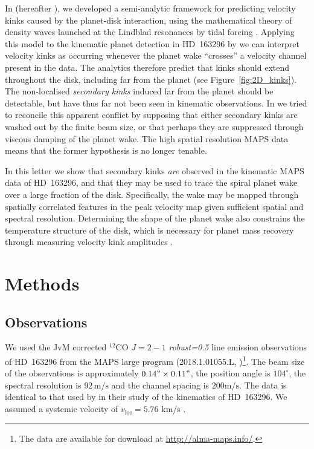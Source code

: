 In \citet{bollati2021} (hereafter ), we developed a semi-analytic framework for predicting velocity kinks caused by the planet-disk interaction, using the mathematical theory of density waves launched at the Lindblad resonances by tidal forcing \citep{goldreich1979,goldreich1980,goodman2001,ogilvie2002,rafikov2002a}.
Applying this model to the kinematic planet detection in HD~163296 by \citet{pinte2018a} we can interpret velocity kinks as occurring whenever the planet wake ``crosses'' a velocity channel present in the data.
The analytics therefore predict that kinks should extend throughout the disk, including far from the planet (see Figure~\ref{fig:2D_kinks}).
The non-localised \textit{secondary kinks} induced far from the planet should be detectable, but have thus far not been seen in kinematic observations.
In  we tried to reconcile this apparent conflict by supposing that either secondary kinks are washed out by the finite beam size, or that perhaps they are suppressed through viscous damping of the planet wake.
The high spatial resolution MAPS data means that the former hypothesis is no longer tenable.

In this letter we show that secondary kinks \textit{are} observed in the kinematic MAPS data of HD~163296, and that they may be used to trace the spiral planet wake over a large fraction of the disk.
Specifically, the wake may be mapped through spatially correlated features in the peak velocity map given sufficient spatial and spectral resolution.
Determining the shape of the planet wake also constrains the temperature structure of the disk, which is necessary for planet mass recovery through measuring velocity kink amplitudes .

\section{Methods}

\subsection{Observations}

We used the JvM corrected \citep{jorsater1995} $^{12}$CO $J=2-1$ \textit{robust=0.5} line emission observations of HD~163296 from the MAPS large program (2018.1.01055.L, \citealt{oberg2021,czekala2021})\footnote{The data are available for download at \url{http://alma-maps.info/}.}.
The beam size of the observations is approximately $0.14" \times 0.11"$, the position angle is $104^\circ$, the spectral resolution is $92 \, \mathrm{m/s}$ and the channel spacing is $200 \mathrm{m/s}$.
The data is identical to that used by \citet{teague2021} in their study of the kinematics of HD~163296.
We assumed a systemic velocity of $v_{\textrm{los}}= 5.76$ km/s \citep{teague2021}.

